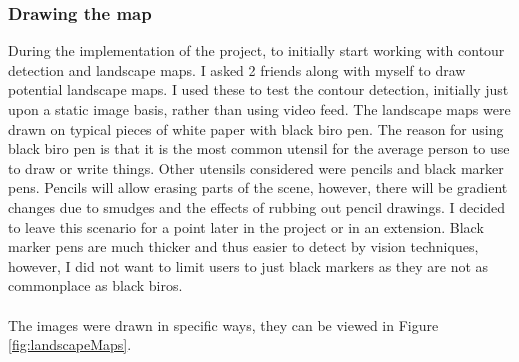 \documentclass[11pt]{article}
\begin{document}
\subsubsection{Drawing the map}
During the implementation of the project, to initially start working 
with contour detection and landscape maps. I asked 2 friends along with
myself to draw potential landscape maps. I used these to test the
contour detection, initially just upon a static image basis, rather than using
video feed. The landscape maps were drawn on typical pieces of white paper with
black biro pen. The reason for using black biro pen is that it is the most
common utensil for the average person to use to draw or write things. Other utensils
considered were pencils and black marker pens. Pencils will allow erasing parts
of the scene, however, there will be gradient changes due to smudges and 
the effects of rubbing out pencil drawings. I decided to leave this 
scenario for a point later in the project or in an extension. 
Black marker pens are much thicker and thus easier
to detect by vision techniques, however, I did not want to limit users
to just black markers as they are not as commonplace as black biros.\\
\\
The images were drawn in specific ways, they can be viewed in Figure 
\ref{fig:landscapeMaps}. \\
\end{document}
